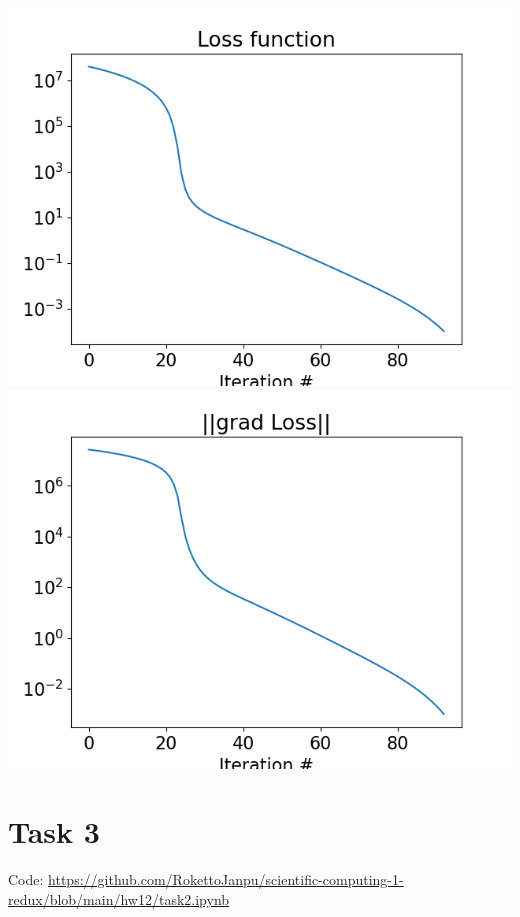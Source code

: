 \documentclass{article}
\begin{document}
\begin{center}
	\includegraphics[scale=.5]{task2 loss}
	\includegraphics[scale=.5]{task2 gradnorm}
\end{center}



\section*{Task 3}

Code: \url{https://github.com/RokettoJanpu/scientific-computing-1-redux/blob/main/hw12/task2.ipynb}

	
\end{document}
